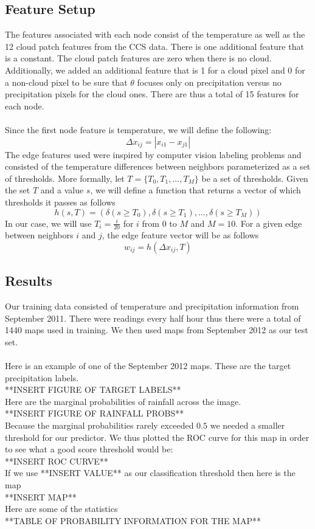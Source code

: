 \subsection{Feature Setup}

The features associated with each node consist of the temperature as well as the 12 cloud patch features from the CCS data. There is one additional feature that is a constant. The cloud patch features are zero when there is no cloud. Additionally, we added an additional feature that is 1 for a cloud pixel and 0 for a non-cloud pixel to be sure that $\theta$ focuses only on precipitation versus no precipitation pixels for the cloud ones. There are thus a total of 15 features for each node. \\
\\
Since the first node feature is temperature, we will define the following:
\[
\Delta x_{ij} = |x_{i1} - x_{j1}|
\]
The edge features used were inspired by computer vision labeling problems and consisted of the temperature differences between neighbors parameterized as a set of thresholds. More formally, let $T = \{ T_0 , T_1, ..., T_M \}$ be a set of thresholds. Given the set $T$ and a value $s$, we will define a function that returns a vector of which thresholds it passes as follows
\[
h(s,T) = ( \delta (s \geq T_0), \delta (s \geq T_1), ..., \delta (s \geq T_M))
\]
In our case, we will use $T_i = \frac{i}{20}$ for $i$ from $0$ to $M$ and $M=10$. For a given edge between neighbors $i$ and $j$, the edge feature vector will be as follows
\[
w_{ij} = h( \Delta x_{ij}, T)
\] 

\subsection{Results}

Our training data consisted of temperature and precipitation information from September 2011. There were readings every half hour thus there were a total of 1440 maps used in training. We then used maps from September 2012 as our test set. \\
\\
Here is an example of one of the September 2012 maps. These are the target precipitation labels. \\
**INSERT FIGURE OF TARGET LABELS**\\
Here are the marginal probabilities of rainfall across the image.\\
**INSERT FIGURE OF RAINFALL PROBS**\\
Because the marginal probabilities rarely exceeded $0.5$ we needed a smaller threshold for our predictor. We thus plotted the ROC curve for this map in order to see what a good score threshold would be:\\
**INSERT ROC CURVE** \\
If we use **INSERT VALUE** as our classification threshold then here is the map\\
**INSERT MAP**\\
Here are some of the statistics \\
**TABLE OF PROBABILITY INFORMATION FOR THE MAP**

